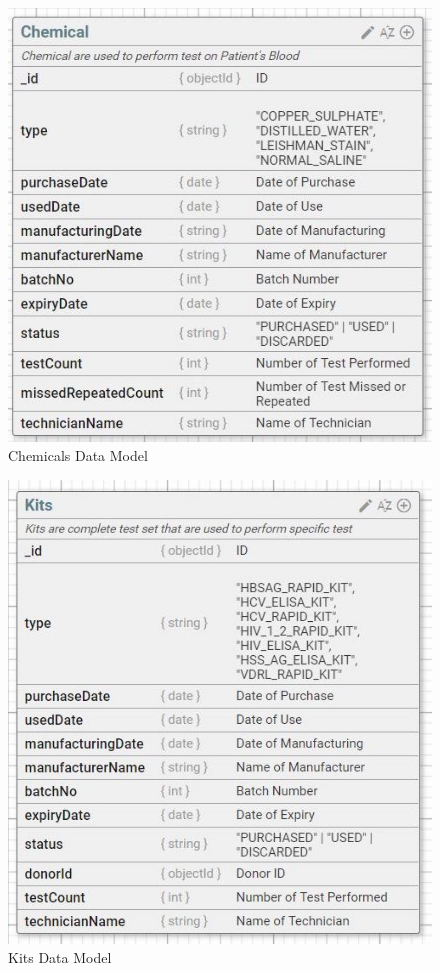 \documentclass[BTech]{srmuthesis}
\begin{document}
\begin{figure}[H]
	\centering
	\includegraphics[scale=0.55]{pus_chemical.jpeg}
	\caption{Chemicals Data Model}
\end{figure}
\begin{figure}[H]
	\centering
	\includegraphics[scale=0.55]{pus_kits.jpeg}
	\caption{Kits Data Model}
\end{figure}
\end{document}
